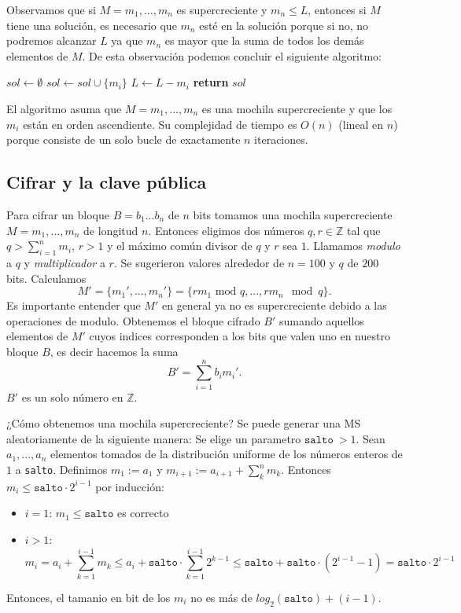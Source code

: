 \documentclass[12pt]{article}
\newcommand{\Z}{\mathbb{Z}}
\begin{document}
Observamos que si $M = m_1, ..., m_n$ es supercreciente y $m_n \leq L$, entonces si $M$ tiene una solución, es necesario que $m_n$ esté en la solución porque si no, no podremos alcanzar $L$ ya que $m_n$ es mayor que la suma de todos los demás elementos de $M$.
De esta observación podemos concluir el siguiente algoritmo:
\vspace{1em}
\begin{algorithmic}[1]
\State $sol \gets \emptyset$
		\State $sol \gets sol \cup \{m_i\}$
		\State $L \gets L - m_i$
	\EndIf
\EndFor
\State \textbf{return} $sol$
\EndProcedure
\end{algorithmic}
\vspace{1em}
El algoritmo asuma que $M = m_1,...,m_n$ es una mochila supercreciente y que los $m_i$ están en orden ascendiente. Su complejidad de tiempo es $O(n)$ (lineal en $n$) porque consiste de un solo bucle de exactamente $n$ iteraciones.

\subsection*{Cifrar y la clave pública}

Para cifrar un bloque $B = b_1...b_n$ de $n$ bits tomamos una mochila supercreciente $M = m_1, ..., m_n$ de longitud $n$. Entonces eligimos dos números $q, r \in \Z$ tal que $q > \sum_{i=1}^nm_i$, $r > 1$ y el máximo común divisor de $q$ y $r$ sea $1$. Llamamos \emph{modulo} a $q$ y \emph{multiplicador} a $r$. Se sugerieron valores alrededor de $n = 100$ y $q$ de $200$ bits. Calculamos
$$M' = \{m_1', ..., m_n'\} = \{r m_1 \text{ mod } q, ..., r m_n \mod q\}.$$
Es importante entender que $M'$ en general ya no es supercreciente debido a las operaciones de modulo. Obtenemos el bloque cifrado $B'$ sumando aquellos elementos de $M'$ cuyos indices corresponden a los bits que valen uno en nuestro bloque $B$, es decir hacemos la suma
$$B' = \sum_{i=1}^nb_im_i'.$$
$B'$ es un solo número en $\Z$.

¿Cómo obtenemos una mochila supercreciente? Se puede generar una MS aleatoriamente de la siguiente manera: Se elige un parametro $\texttt{salto}\ > 1$. Sean $a_1, ..., a_n$ elementos tomados de la distribución uniforme de los números enteros de $1$ a \texttt{salto}. Definimos $m_1 := a_1$ y $m_{i+1} := a_{i+1} + \sum_k^n m_{k}$. Entonces $m_i \leq \texttt{salto} \cdot 2^{i-1}$ por inducción:
\begin{itemize}
	\item $i = 1$: $m_1 \leq \texttt{salto}$ es correcto
	\item $i > 1$:
	$$m_{i} = a_i + \sum_{k=1}^{i-1} m_{k} \leq a_i + \texttt{salto} \cdot \sum_{k=1}^{i-1}2^{k-1} \leq \texttt{salto} + \texttt{salto} \cdot ( 2^{i-1} - 1) = \texttt{salto} \cdot 2^{i-1}$$
\end{itemize}
Entonces, el tamanio en bit de los $m_i$ no es más de $log_2(\texttt{salto}) + (i-1)$.
\end{document}
